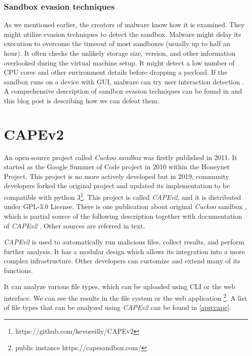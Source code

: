\subsubsection*{Sandbox evasion techniques}
As we mentioned earlier, the creators of malware know how it is examined. They might utilize evasion techniques to detect the sandbox. Malware might delay its execution to overcome the timeout of most sandboxes (usually up to half an hour). It often checks the unlikely storage size, version, and other information overlooked during the virtual machine setup. It might detect a low number of CPU cores and other environment details before dropping a payload. If the sandbox runs on a device with GUI, malware can try user interaction detection \cite{Evolutio45:online}. A comprehensive description of sandbox evasion techniques can be found in \cite{Afianian2018} and this blog post \cite{Chailytko2019} is describing how we can defeat them.

\section{CAPEv2}
An open-source project called \emph{Cuckoo sandbox} was firstly published in 2011. It started as the Google Summer of Code project in 2010 within the Honeynet Project. This project is no more actively developed but in 2019, community developers forked the original project and updated its implementation to be compatible with python 3\footnote{https://github.com/kevoreilly/CAPEv2}. This project is called \emph{CAPEv2}, and it is distributed under GPL-3.0 License. There is one publication about original \emph{Cuckoo} sandbox \cite{Oktavianto2013}, which is partial source of the following description together with documentation of \emph{CAPEv2} \cite{CAPESand75:online}. Other sources are referred in text.

\emph{CAPEv2} is used to automatically run malicious files, collect results, and perform further analysis. It has a modular design which allows its integration into a more complex infrastructure. Other developers can customize and extend many of its functions.

It can analyze various file types, which can be uploaded using CLI  or the web interface. We can see the results in the file system or the web application \footnote{public instance https://capesandbox.com/}. A list of file types that can be analyzed using \emph{CAPEv2} can be found in \ref{app:cape}.


